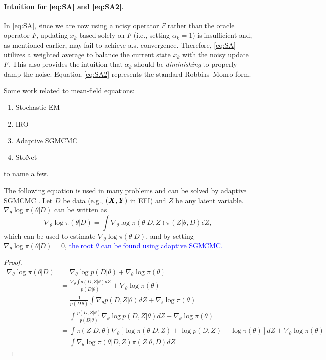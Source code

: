\documentclass[11pt,twoside]{article}
\begin{document}
\paragraph{Intuition for \eqref{eq:SA} and \eqref{eq:SA2}.} In \eqref{eq:SA}, since we are now using a noisy operator $F$ rather than the oracle operator $\bar F$, updating $x_k$ based solely on $F$ (i.e., setting $\alpha_k = 1$) is insufficient and, as mentioned earlier, may fail to achieve a.s. convergence. Therefore, \eqref{eq:SA} utilizes a weighted average to balance the current state $x_k$ with the noisy update $F$. This also provides the intuition that $\alpha_k$ should be \emph{diminishing} to properly damp the noise. Equation \eqref{eq:SA2} represents the standard Robbins–Monro form.

\begin{remark}
    Some work related to mean-field equations:
    \begin{enumerate}
        \item Stochastic EM
        \item IRO \cite{liang2018imputation}
        \item Adaptive SGMCMC \cite{LiangKS2024EFI}
        \item StoNet \cite{LiangSLiang2022}
    \end{enumerate}
   to name a few.
\end{remark}
 
\begin{remark}
    The following equation is used in many problems and can be solved by adaptive SGMCMC \cite{SongLiang2020eSGLD, LiangKS2024EFI}. Let $D$ be data (e.g., $({\boldsymbol X},{\boldsymbol Y})$ in EFI) and $Z$ be any latent variable. $\nabla_{\theta} \log \pi(\theta|D)$ can be written as
    \[
    \nabla_{\theta} \log \pi(\theta|D) = \int \nabla_{\theta}\log \pi(\theta|D,Z) \pi(Z |\theta, D) dZ,
    \]
    which can be used to estimate $\nabla_{\theta} \log \pi(\theta|D)$, and by setting $\nabla_{\theta} \log \pi(\theta|D) = 0$, \textcolor{blue}{the root $\theta$ can be found using adaptive SGMCMC.}
    \begin{proof}
        \begin{align*}
            \nabla_{\theta} \log \pi(\theta|D) &=  \nabla_{\theta} \log p(D|\theta) + \nabla_{\theta}\log \pi(\theta) \\
            &=  \frac{\nabla_{\theta} \int p(D, Z|\theta)dZ}{p(D|\theta)} + \nabla_{\theta}\log \pi(\theta) \\
            &= \frac{1}{p(D|\theta)}  \int \nabla_{\theta} p(D, Z|\theta)dZ+ \nabla_{\theta}\log \pi(\theta) \\
             &= \int \frac{p(D, Z|\theta)}{p(D|\theta)}  \nabla_{\theta} \log p(D, Z|\theta)dZ+ \nabla_{\theta}\log \pi(\theta) \\
             &= \int \pi(Z |D, \theta) \nabla_{\theta}[\log\pi(\theta | D, Z) + \log p(D,Z) - \log\pi(\theta)]dZ + \nabla_{\theta}\log \pi(\theta) \\
             &= \int \nabla_{\theta}\log \pi(\theta|D,Z) \pi(Z |\theta, D) dZ
        \end{align*}
    \end{proof}
\end{remark}
\end{document}
